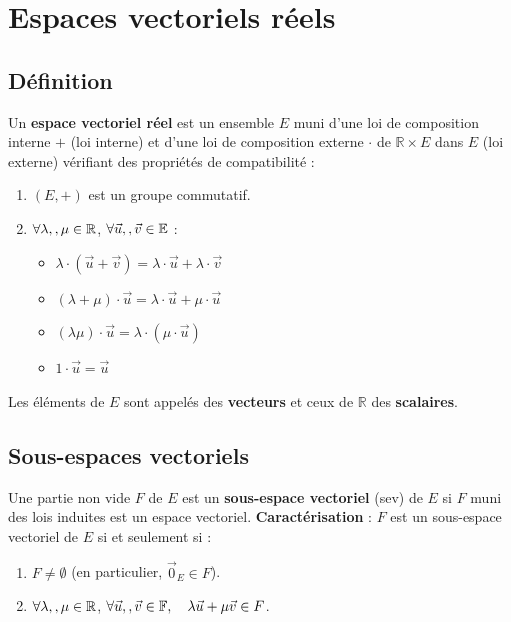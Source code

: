 \documentclass{article}
\begin{document}
	\section{Espaces vectoriels réels}
	
	\subsection{Définition}
	Un \textbf{espace vectoriel réel} est un ensemble $E$ muni d'une loi de composition interne $+$ (loi interne) et d'une loi de composition externe $\cdot$ de $\mathbb{R} \times E$ dans $E$ (loi externe) vérifiant des propriétés de compatibilité :
	\begin{enumerate}
		\item $(E, +)$ est un groupe commutatif.
		\item $\qcq{\lambda}[, \mu]{R}$, $\qcq{\vec{u}}[, \vec{v}]{E}$ :
		\begin{itemize}
			\item $\lambda \cdot (\vec{u} + \vec{v}) = \lambda \cdot \vec{u} + \lambda \cdot \vec{v}$
			\item $(\lambda + \mu) \cdot \vec{u} = \lambda \cdot \vec{u} + \mu \cdot \vec{u}$
			\item $(\lambda\mu) \cdot \vec{u} = \lambda \cdot (\mu \cdot \vec{u})$
			\item $1 \cdot \vec{u} = \vec{u}$
		\end{itemize}
	\end{enumerate}
	Les éléments de $E$ sont appelés des \textbf{vecteurs} et ceux de $\mathbb{R}$ des \textbf{scalaires}.
	
	\subsection{Sous-espaces vectoriels}
	Une partie non vide $F$ de $E$ est un \textbf{sous-espace vectoriel} (sev) de $E$ si $F$ muni des lois induites est un espace vectoriel.
	\textbf{Caractérisation} :
	$F$ est un sous-espace vectoriel de $E$ si et seulement si :
	\begin{enumerate}
		\item $F \ne \emptyset$ (en particulier, $\vec{0}_E \in F$).
		\item $\qcq{\lambda}[, \mu]{R}$, $\qcq{\vec{u}}[, \vec{v}]{F}, \quad \lambda\vec{u} + \mu\vec{v} \in F$.
	\end{enumerate}
	
\end{document}
